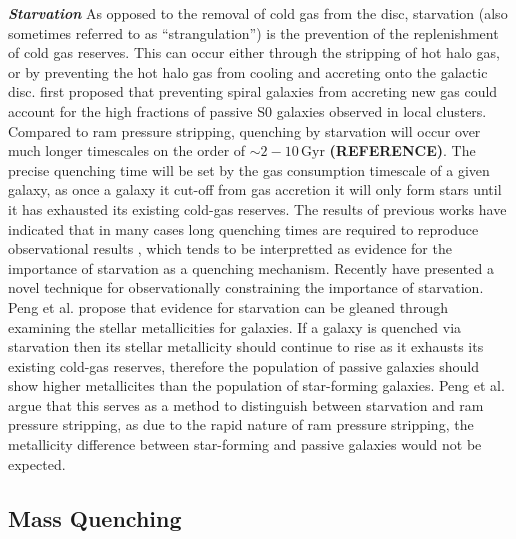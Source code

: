\noindent \textit{\textbf{Starvation}}
\smallskip
\newline
As opposed to the removal of cold gas from the disc, starvation (also
sometimes referred to as ``strangulation'') is the prevention of the
replenishment of cold gas reserves.  This can occur either through the
stripping of hot halo gas, or by preventing the hot halo gas from
cooling and accreting onto the galactic disc.  \citet{larson1980}
first proposed that preventing spiral galaxies from accreting new gas
could account for the high fractions of passive S0 galaxies observed
in local clusters.  Compared to ram pressure stripping, quenching by
starvation will occur over much longer timescales on the order of
$\sim 2 - 
10\,\mathrm{Gyr}$ \textbf{(REFERENCE)}.  The precise quenching time
will be set by the gas consumption timescale of a given galaxy, as
once a galaxy it cut-off from gas accretion it will only form stars
until it has exhausted its existing cold-gas reserves.  The results of
previous works have indicated that in many cases long quenching times
are required to reproduce observational results \citep{balogh2000,
  balogh2000b, wetzel2013, wheeler2014}, which tends to be interpretted as
evidence for the importance of starvation as a quenching mechanism.
Recently \citet{peng2015} have presented a novel technique for
observationally constraining the importance of starvation.  Peng et
al. propose that evidence for starvation can be gleaned through
examining the stellar metallicities for galaxies.  If a galaxy is
quenched via starvation then its stellar metallicity should continue
to rise as it exhausts its existing cold-gas reserves, therefore the
population of passive galaxies should show higher metallicites than
the population of star-forming galaxies.  Peng et al. argue that this
serves as a method to distinguish between starvation and ram pressure
stripping, as due to the rapid nature of ram pressure stripping, the
metallicity difference between star-forming and passive galaxies would
not be expected.  

\subsection{Mass Quenching}
\label{mass_quench}

%


